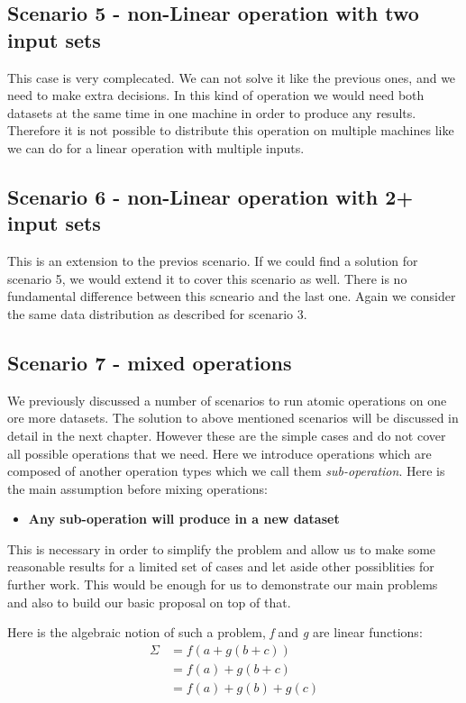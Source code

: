 \subsection{Scenario 5 - non-Linear operation with two input sets}
This case is very complecated. We can not solve it like the previous ones, and we need to make extra decisions.
In this kind of operation we would need both datasets at the same time in one machine in order to produce any
results. Therefore it is not possible to distribute this operation on multiple machines like we can do for 
a linear operation with multiple inputs. 

\subsection{Scenario 6 - non-Linear operation with 2+ input sets}
This is an extension to the previos scenario. 
If we could find a solution for scenario 5, we would extend it to cover this scenario as well. 
There is no fundamental difference between this scneario and the last one. Again we consider the same
data distribution as described for scenario 3.

\subsection{Scenario 7 - mixed operations}
We previously discussed a number of scenarios to run atomic operations on one ore more datasets. The solution to 
above mentioned scenarios will be discussed in detail in the next chapter. However these are the simple cases and
do not cover all possible operations that we need. Here we introduce operations which are composed of another
operation types which we call them \textit{sub-operation}.
Here is the main assumption before mixing operations:

\begin{itemize}
\item \textbf{Any sub-operation will produce in a new dataset}
\end{itemize}

This is necessary in order to simplify the problem and allow us to make some reasonable results
for a limited set of cases and let aside other possiblities for further work. This would be enough
for us to demonstrate our main problems and also to build our basic proposal on top of that.

Here is the algebraic notion of such a problem, \textit{f} and \textit{g} are linear functions:
\begin{subequations}
\begin{align*}
\Sigma &= f(a + g(b + c))\\
&= f(a) + g(b + c)\\
&= f(a) + g(b) + g(c)
\end{align*}
\end{subequations}

